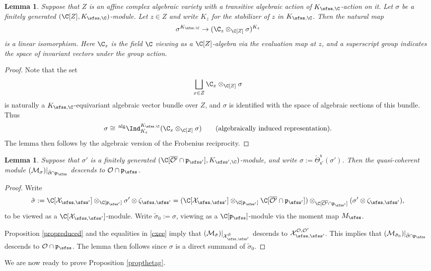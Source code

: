 \documentclass[12pt,a4paper]{amsart}
\newcommand{\CM}{{\mathcal {M}}}
\newcommand{\CO}{{\mathcal {O}}}
\newcommand{\CX}{{\mathcal {X}}}
\newcommand{\p}{\mathfrak p}
\numberwithin{equation}{section}
\newtheorem{lem}[thm]{Lemma}
\theoremstyle{remark}
\begin{document}
\begin{lem}\label{geotheta2}
Suppose that  $Z$ is an affine complex algebraic variety with a transitive algebraic action of $K_{\sfss, \C}$-action on it. Let $\sigma$ be a finitely generated $(\C[Z], K_{\sfss, \C})$-module.
Let $z\in Z$ and write $K_z$ for the stabilizer of $z$ in $K_{\sfss, \C}$. Then  the natural map
\[
  \sigma^{K_{\sfss, \C}}\rightarrow (\C_z\otimes_{\C[Z]} \sigma)^{K_{z}}
\]
is a linear isomorphism. Here $\C_z$ is the field $\C$ viewing as a $\C[Z]$-algebra via the evaluation map at $z$, and a superscript group indicates the space of  invariant vectors under the group action. 
\end{lem}
\begin{proof}
Note that the set 
\[
 \bigsqcup_{x\in Z} \C_x\otimes_{\C[Z]} \sigma
\]
is naturally a $K_{\sfss, \C}$-equivariant algebraic vector bundle over $Z$, and  $\sigma$ is identified with the space of algebraic sections of this bundle. Thus 
\[
  \sigma\cong \,^{\mathrm{alg}}\Ind_{K_z}^{K_{\sfss, \C}}(\C_x\otimes_{\C[Z]}\sigma)\qquad(\textrm{algebraically induced representation}).
\]
The lemma then follows by the algebraic version of the Frobenius reciprocity. 
\end{proof}


\begin{lem}\label{geotheta3}
Suppose that $\sigma'$ is a finitely generated  $(\C[\overline{\CO'}\cap \p_{\sfss'}], K_{\sfss', \C})$-module, and write $\sigma:=\check \Theta_{\mathsf s'}^{\mathsf s}(\sigma')$. Then the  quasi-coherent module $(\CM_\sigma)|_{\bar \partial \cap \p_\sfss}$ descends  to $\CO\cap \p_\sfss$. 
\end{lem}
\begin{proof}
Write 
\[
 \tilde \sigma:=\C[\CX_{\sfss, \sfss'}]\otimes_{\C[\p_{\sfss'}]} \sigma'\otimes \zeta_{\sfss, \sfss'}=(\C[\CX_{\sfss, \sfss'}]\otimes_{\C[\p_{\sfss'}]} {\C[\overline{\CO'}\cap \p_{\sfss'}]})\otimes_{\C[\overline{\CO'}\cap \p_{\sfss'}]}(\sigma'\otimes \zeta_{\sfss, \sfss'}),
\]
to be viewed as a $\C[\CX_{\sfss, \sfss'}]$-module. Write $\tilde \sigma_0:=\sigma$, viewing as a $\C[\p_\sfss]$-module via the moment map $M_\sfss$. 

Proposition \ref{propreduced} and the equalities  in \eqref{cxee} imply that 
$(\CM_{ \tilde \sigma})|_{\CX_{\sfss, \sfss'}^{\bar \partial}}$ descends to $ \CX_{\sfss, \sfss'}^{\CO, \CO'}$. This implies that $(\CM_{ \tilde \sigma_0})|_{\bar \partial\cap \p_\sfss}$ descends to $ \CO\cap \p_\sfss$. The lemma then follows since $\sigma$ is a direct summand of $\tilde \sigma_0$. 

\end{proof}
We are now ready to prove Proposition \ref{propthetag}. 
\end{document}
